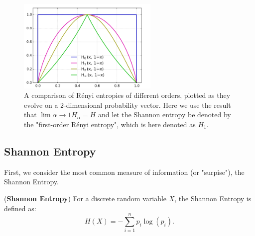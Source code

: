 \begin{figure}[h!]
    \centering
    \includegraphics[width=0.6\textwidth]{figures/renyi.png}
    \caption{A comparison of Rényi entropies of different orders, plotted as they evolve on a $2$-dimensional probability vector. Here we use the result that $\lim{\alpha \rightarrow 1} H_\alpha = H$ and let the Shannon entropy be denoted by the "first-order Rényi entropy", which is here denoted as $H_1$.}
\end{figure}

\subsection{Shannon Entropy}
\label{sec:shannon}

First, we consider the most common measure of information (or "surpise"), the Shannon Entropy.

\begin{definition}
    \label{def:shannon}
    (\textbf{Shannon Entropy}) For a discrete random variable $X$, the Shannon Entropy is defined as: 
    \[H(X) = - \sum^n_{i=1}p_i \log(p_i) . \]
\end{definition}


